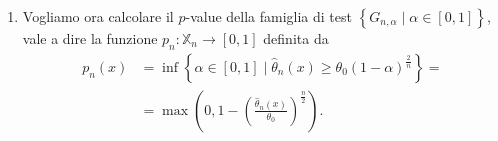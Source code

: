 \begin{soluzione}
\begin{enumerate}
\[        \right) \ge c_{n,\alpha} \right\}
    \]
    dove \(c_{n,\alpha}\) è da determinare in modo tale che
    \[
      \mathbb{P}_{\theta_0} \left[ X \in G_{n, \alpha} \right] =
      \alpha .
    \]
    Possiamo calcolare questa probabilità usando la funzione di
    ripartizione di \(\max \left( X_1, \dots{}, X_n \right)\), dove
    \(X_1, \dots{}, X_n\) sono variabili aleatorie i.i.d. con
    distribuzione \(f_\theta\), e che abbiamo già calcolato:
    \begin{align*}
      \mathbb{P}_{\theta_0} \left[ X \in G_{n, \alpha} \right] &= \mathbb{P}_{\theta_0} \left[ \max
                                                                 \left( X_1, \dots{}, X_n
                                                                 \right) \ge 4 c_{n, \alpha}
                                                                 \right] = \\
                                                               &= 1 - \mathbb{P}_{\theta_0} \left[ \max
                                                                 \left( X_1, \dots{}, X_n
                                                                 \right) \le 4 c_{n, \alpha}
                                                                 \right] = \\
                                                               &= 1 - F_{n, \theta_0}\left(
                                                                 4c_{n,\alpha} \right) = \\
                                                               &= 1 -
                                                                 \left( \frac{c_{n,\alpha}}{\theta_0} \right)^{\frac{n}{2}}
    \end{align*} 
    Quindi basta scegliere
    \(c_{n, \alpha} = \theta_0 (1-\alpha)^{\frac{2}{n}}\) e una
    regione critica per il test uniformemente più potente è
    \begin{align*}
      G_{n, \alpha} &= \left\{ \left( x_1, \dots{}, x_n \right) \in \mathbb{X}_n \mid
                      \hat \theta_n \left( x_1, \dots{}, x_n \right) \ge \theta_0 (1-\alpha)^{\frac{2}{n}}
                      \right\} = \\
                    &= \left\{ \left( x_1, \dots{}, x_n \right) \in \mathbb{X}_n \mid
                      \max \left( x_1, \dots{}, x_n \right) \ge 4 \theta_0 (1-\alpha)^{\frac{2}{n}}
                      \right\} 
    \end{align*}

  \item Vogliamo ora calcolare il \(p\)-value della famiglia di test
    \(\left\{ G_{n, \alpha} \mid \alpha \in [0, 1] \right\}\), vale a
    dire la funzione \(p_n : \mathbb{X}_n \to [0,1]\) definita da
    \begin{align*}
      p_n (x) &= \inf \left\{ \alpha \in [0, 1] \mid \hat \theta_n (x) \ge \theta_0 (1-\alpha)^{\frac{2}{n}} \right\} = \\
              &= \max \left(0, 1-\left(\frac{\hat \theta_n (x)}{\theta_0}\right)^{\frac{n}{2}}\right) .
    \end{align*}
    

\end{enumerate}
\end{soluzione}
